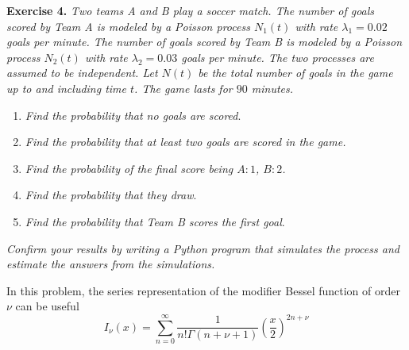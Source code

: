 
\textbf{Exercise 4. }\emph{Two teams A and B play a soccer match. The number of goals scored by Team A is modeled by a Poisson process \( N_{1}(t) \) with rate \( \lambda_{1} = 0.02 \) goals per minute. The number of goals scored by Team B is modeled by a Poisson process \( N_{2}(t)\) with rate \( \lambda_{2} = 0.03\) goals per minute. The two processes are assumed to be independent. Let \( N(t) \) be the total number of goals in the game up to and including time \( t \). The game lasts for \( 90 \) minutes.}
\begin{enumerate}
  \item \emph{Find the probability that no goals are scored}.
  \item \emph{Find the probability that at least two goals are scored in the game.}
  \item \emph{Find the probability of the final score being \( A:1 \), \( B:2\). }
  \item  \emph{Find the probability that they draw}.
  \item  \emph{Find the probability that Team B scores the first goal}.
\end{enumerate}
\emph{Confirm your results by writing a Python program that simulates the process and estimate the answers from the simulations.}

In this problem, the series representation of the modifier Bessel function of order \( \nu \) can be useful
\[
  I_{\nu}(x) = \sum_{n=0}^{\infty} \frac{1}{n! \Gamma(n + \nu + 1)}\left( \frac{x}{2} \right)^{2n + \nu}
\]

